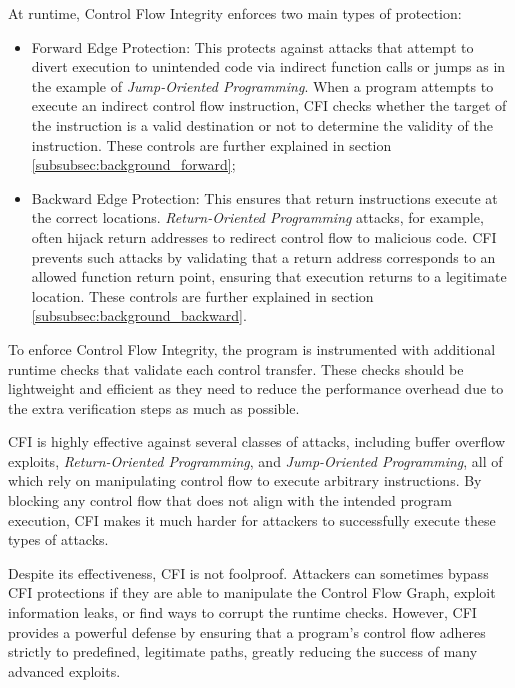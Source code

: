 At runtime, Control Flow Integrity enforces two main types of protection:
\begin{itemize}
  \item Forward Edge Protection: This protects against attacks that attempt to
    divert execution to unintended code via indirect function calls or jumps as
    in the example of \textit{Jump-Oriented Programming}. When a program
    attempts to execute an indirect control flow instruction, CFI checks whether
    the target of the instruction is a valid destination or not to determine the
    validity of the instruction. These controls are further explained in section
    \ref{subsubsec:background_forward};

  \item Backward Edge Protection: This ensures that return instructions execute
    at the correct locations. \textit{Return-Oriented Programming} attacks, for example,
    often hijack return addresses to redirect control flow to malicious code. CFI
    prevents such attacks by validating that a return address corresponds to an allowed
    function return point, ensuring that execution returns to a legitimate
    location. These controls are further explained in section \ref{subsubsec:background_backward}.
\end{itemize}

To enforce Control Flow Integrity, the program is instrumented with additional
runtime checks that validate each control transfer. These checks should be lightweight
and efficient as they need to reduce the performance overhead due to the extra verification
steps as much as possible.

CFI is highly effective against several classes of attacks, including buffer
overflow exploits, \textit{Return-Oriented Programming}, and \textit{Jump-Oriented
Programming}, all of which rely on manipulating control flow to execute arbitrary
instructions. By blocking any control flow that does not align with the intended
program execution, CFI makes it much harder for attackers to successfully execute
these types of attacks.

Despite its effectiveness, CFI is not foolproof. Attackers can sometimes bypass CFI
protections if they are able to manipulate the Control Flow Graph, exploit
information leaks, or find ways to corrupt the runtime checks. However, CFI provides
a powerful defense by ensuring that a program's control flow adheres strictly to
predefined, legitimate paths, greatly reducing the success of many advanced exploits.

